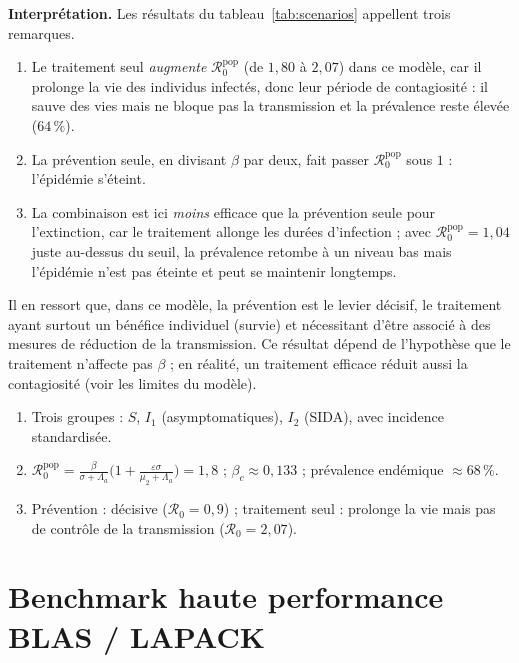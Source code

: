\documentclass[11pt,a4paper]{report}
\theoremstyle{plain}
\theoremstyle{definition}
\theoremstyle{remark}
\newcommand{\Rzero}{\mathcal{R}_0}
\begin{document}
\noindent\textbf{Interprétation.} Les résultats du tableau~\ref{tab:scenarios} appellent trois remarques.
\begin{enumerate}
    \item Le traitement seul \emph{augmente} $\Rzero^{\mathrm{pop}}$ (de $1{,}80$ à $2{,}07$) dans ce modèle, car il prolonge la vie des individus infectés, donc leur période de contagiosité : il sauve des vies mais ne bloque pas la transmission et la prévalence reste élevée ($64\,\%$).
    \item La prévention seule, en divisant $\beta$ par deux, fait passer $\Rzero^{\mathrm{pop}}$ sous $1$ : l'épidémie s'éteint.
    \item La combinaison est ici \emph{moins} efficace que la prévention seule pour l'extinction, car le traitement allonge les durées d'infection ; avec $\Rzero^{\mathrm{pop}}=1{,}04$ juste au-dessus du seuil, la prévalence retombe à un niveau bas mais l'épidémie n'est pas éteinte et peut se maintenir longtemps.
\end{enumerate}
Il en ressort que, dans ce modèle, la prévention est le levier décisif, le traitement ayant surtout un bénéfice individuel (survie) et nécessitant d'être associé à des mesures de réduction de la transmission. Ce résultat dépend de l'hypothèse que le traitement n'affecte pas $\beta$ ; en réalité, un traitement efficace réduit aussi la contagiosité (voir les limites du modèle).

\begin{encadreresume}
\begin{enumerate}
    \item Trois groupes : $S$, $I_1$ (asymptomatiques), $I_2$ (SIDA), avec incidence standardisée.
    \item $\Rzero^{\mathrm{pop}}=\frac{\beta}{\sigma+\Lambda_a}\big(1+\frac{\varepsilon\sigma}{\mu_2+\Lambda_a}\big)=1{,}8$ ; $\beta_c\approx0{,}133$ ; prévalence endémique $\approx68\,\%$.
    \item Prévention : décisive ($\Rzero=0{,}9$) ; traitement seul : prolonge la vie mais pas de contrôle de la transmission ($\Rzero=2{,}07$).
\end{enumerate}
\end{encadreresume}

\chapter{Benchmark haute performance BLAS / LAPACK}
\end{document}
